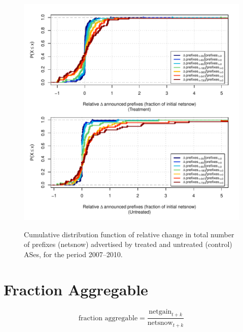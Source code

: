 \begin{figure}[H]
\begin{centering}
\begin{singlespace}
    \includegraphics[width=6in]{figures/behavior-rel_netsnow-2007_2010-corr.pdf}
    \vspace{-2em}\\
    \caption{Cumulative distribution function of relative change in total number of prefixes (netsnow) advertised by treated and untreated (control) ASes, for the period 2007--2010.}
\end{singlespace}
\end{centering}
\end{figure}

\section{Fraction Aggregable}

\[
\textrm{fraction aggregable} = \frac{\textrm{netgain}_{t+k}}
                                    {\textrm{netsnow}_{t+k}}
\]

